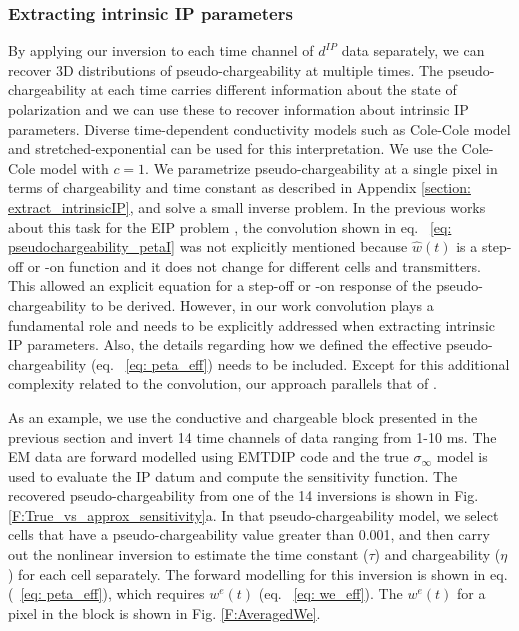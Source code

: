 \documentclass[extra,mreferee]{gji}
\newcommand{\siginf}{\sigma_\infty}
\newcommand{\dip}{d^{IP}}
\begin{document}
\subsubsection{Extracting intrinsic IP parameters}
By applying our inversion to each time channel of $\dip$ data separately, we can recover 3D distributions of pseudo-chargeability at multiple times. 
The pseudo-chargeability at each time carries different information about the state of polarization and we can use these to recover information about intrinsic IP parameters. 
Diverse time-dependent conductivity models such as Cole-Cole model and stretched-exponential can be used for this interpretation.
We use the Cole-Cole model with $c=1$. 
We parametrize pseudo-chargeability at a single pixel in terms of chargeability and time constant as described in Appendix \ref{section: extract_intrinsicIP}, and solve a small inverse problem. 
In the previous works about this task for the EIP problem \cite[]{Yuval1997,Hordt2006}, the convolution shown in eq. ~\ref{eq: pseudochargeability_petaI} was not explicitly mentioned because $\hat{w}(t)$ is a step-off or -on function and it does not change for different cells and transmitters. This allowed an explicit equation for a step-off or -on response of the pseudo-chargeability to be derived. 
However, in our work convolution plays a fundamental role and needs to be explicitly addressed when extracting intrinsic IP parameters. Also, the details regarding how we defined the effective pseudo-chargeability (eq. ~\ref{eq: peta_eff}) needs to be included.  Except for this additional complexity related to the convolution, our approach parallels that of \cite{Yuval1997,Hordt2006}.

As an example, we use the conductive and chargeable block presented in the previous section and invert 14 time channels of data ranging from 1-10 ms.  The EM data are forward modelled using EMTDIP code and the true $\siginf$ model is used  to evaluate the IP datum and compute the sensitivity function. The recovered pseudo-chargeability from one of the 14 inversions is shown in Fig. \ref{F:True_vs_approx_sensitivity}a. In that pseudo-chargeability model, we select cells that have a pseudo-chargeability value greater than 0.001, and then carry out the nonlinear inversion to estimate the time constant ($\tau$) and chargeability ($\eta$) for each cell separately. The forward modelling for this inversion is shown in eq. (~\ref{eq: peta_eff}), which requires $w^e(t)$ (eq. ~\ref{eq: we_eff}). 
The $w^e(t)$ for a pixel in the block is shown in Fig. \ref{F:AveragedWe}.
\end{document}
